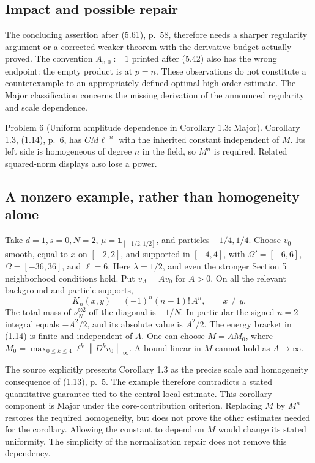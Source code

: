 \documentclass[10pt]{article}
\begin{document}
\subsection*{Impact and possible repair}
The concluding assertion after (5.61), p. 58, therefore needs a sharper regularity argument or a corrected weaker theorem with the derivative budget actually proved. The convention \(A_{v,0}:=1\) printed after (5.42) also has the wrong endpoint: the empty product is at \(p=n\). These observations do not constitute a counterexample to an appropriately defined optimal high-order estimate. The Major classification concerns the missing derivation of the announced regularity and scale dependence.\par
Problem 6 (Uniform amplitude dependence in Corollary 1.3: Major).  Corollary 1.3, (1.14), p. 6, has \(CM\ell^{-n}\) with the inherited constant independent of \(M\). Its left side is homogeneous of degree \(n\) in the field, so \(M^n\) is required. Related squared-norm displays also lose a power.\par
\subsection*{A nonzero example, rather than homogeneity alone}
Take \(d=1,s=0,N=2\), \(\mu=\mathbf1_{[-1/2,1/2]}\), and particles \(-1/4,1/4\). Choose \(v_0\) smooth, equal to \(x\) on \([-2,2]\), and supported in \([-4,4]\), with \(\Omega'=[-6,6]\), \(\Omega=[-36,36]\), and \(\ell=6\). Here \(\lambda=1/2\), and even the stronger Section 5 neighborhood conditions hold. Put \(v_A=A v_0\) for \(A>0\). On all the relevant background and particle supports, \[K_n(x,y)=(-1)^n(n-1)!\,A^n,\qquad x\ne y.\] The total mass of \(\nu_N^{\otimes2}\) off the diagonal is \(-1/N\). In particular the signed \(n=2\) integral equals \(-A^2/2\), and its absolute value is \(A^2/2\). The energy bracket in (1.14) is finite and independent of \(A\). One can choose \(M=A M_0\), where \(M_0=\max_{0\leq k\leq4}\ell^k\left\lVert D^kv_0\right\rVert_\infty\). A bound linear in \(M\) cannot hold as \(A\to\infty\).\par
The source explicitly presents Corollary 1.3 as the precise scale and homogeneity consequence of (1.13), p. 5. The example therefore contradicts a stated quantitative guarantee tied to the central local estimate. This corollary component is Major under the core-contribution criterion. Replacing \(M\) by \(M^n\) restores the required homogeneity, but does not prove the other estimates needed for the corollary. Allowing the constant to depend on \(M\) would change its stated uniformity. The simplicity of the normalization repair does not remove this dependency.\par
\end{document}
